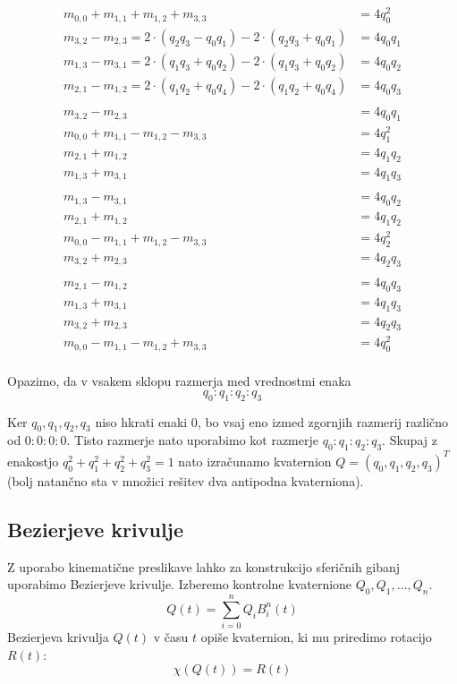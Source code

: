 \documentclass[12pt,a4paper,twoside]{article}
\theoremstyle{definition} %
\theoremstyle{plain} %
\numberwithin{equation}{section}  %
\begin{document}
\begin{align*}
m_{0,0} + m_{1,1} + m_{1,2} + m_{3,3} &= 4 q_0^2 \\
m_{3,2} - m_{2,3} = 2 \cdot (q_2 q_3 - q_0 q_1) - 2 \cdot (q_2 q_3 + q_0 q_1) &= 4 q_0 q_1 \\
m_{1,3} - m_{3,1} = 2 \cdot (q_1 q_3 + q_0 q_2) - 2 \cdot (q_1 q_3 + q_0 q_2) &= 4 q_0 q_2 \\
m_{2,1} - m_{1,2} = 2 \cdot (q_1 q_2 + q_0 q_4) - 2 \cdot (q_1 q_2 + q_0 q_4) &= 4 q_0 q_3 \\
& \\
m_{3,2} - m_{2,3} & = 4 q_0 q_1 \\
m_{0,0} + m_{1,1} - m_{1,2} - m_{3,3} &= 4 q_1^2 \\
m_{2,1} + m_{1,2} &= 4 q_1 q_2 \\
m_{1,3} + m_{3,1} &= 4 q_1 q_3 \\
& \\
m_{1,3} - m_{3,1} &= 4 q_0 q_2 \\
m_{2,1} + m_{1,2} &= 4 q_1 q_2 \\
m_{0,0} - m_{1,1} + m_{1,2} - m_{3,3} &= 4 q_2^2 \\
m_{3,2} + m_{2,3} &= 4 q_2 q_3 \\
& \\
m_{2,1} - m_{1,2} &= 4 q_0 q_3 \\
m_{1,3} + m_{3,1} &= 4 q_1 q_3 \\
m_{3,2} + m_{2,3} &= 4 q_2 q_3 \\
m_{0,0} - m_{1,1} - m_{1,2} + m_{3,3} &= 4 q_0^2 \\
\end{align*}

\noindent Opazimo, da v vsakem sklopu razmerja med vrednostmi enaka
$$ q_0 : q_1 : q_2 : q_3 $$

\noindent Ker $q_0,q_1,q_2,q_3$ niso hkrati enaki $0$, bo vsaj eno izmed zgornjih razmerij različno od $0 : 0 : 0 : 0$. Tisto razmerje nato uporabimo kot razmerje $ q_0 : q_1 : q_2 : q_3 $. Skupaj z enakostjo $q_0^2 + q_1^2 + q_2^2 + q_3^2 = 1$ nato izračunamo kvaternion $Q=(q_0,q_1,q_2,q_3)^T$ (bolj natančno sta v množici rešitev dva antipodna kvaterniona).
\subsection{Bezierjeve krivulje}
\noindent Z uporabo kinematične preslikave lahko za konstrukcijo sferičnih gibanj uporabimo Bezierjeve krivulje. Izberemo kontrolne kvaternione $Q_0,Q_1,\dots,Q_n$.
$$Q(t) = \sum\limits_{i=0}^{n} Q_i B_i^n(t)$$
\noindent Bezierjeva krivulja $Q(t)$ v času $t$ opiše kvaternion, ki mu priredimo rotacijo $R(t)$:
$$\chi(Q(t)) = R(t)$$
\end{document}
